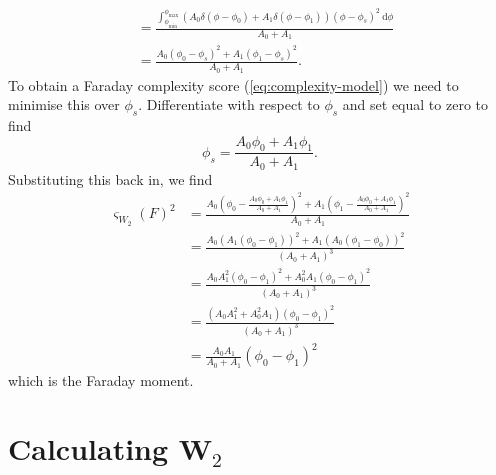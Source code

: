 \begin{appendix}
\begin{align}
        &= \frac{\int_{\phi_{\min}}^{\phi_{\max}} (A_0 \delta(\phi - \phi_0) + A_1 \delta(\phi - \phi_1)) (\phi - \phi_s)^2\ \mathrm{d}\phi}{A_0 + A_1}\\
        &= \frac{A_0 (\phi_0 - \phi_s)^2 + A_1 (\phi_1 - \phi_s)^2}{A_0 + A_1}.
    \end{align}
    To obtain a Faraday complexity score (\autoref{eq:complexity-model}) we need to minimise this over $\phi_s$. Differentiate with respect to $\phi_s$ and set equal to zero to find
    \begin{equation}
      \phi_s = \frac{A_0 \phi_0 + A_1 \phi_1}{A_0 + A_1}.
    \end{equation}
    Substituting this back in, we find
    \begin{align}
      \varsigma_{W_2}(F)^2 &= \frac{A_0 (\phi_0 - \frac{A_0 \phi_0 + A_1 \phi_1}{A_0 + A_1})^2 + A_1 (\phi_1 - \frac{A_0 \phi_0 + A_1 \phi_1}{A_0 + A_1})^2}{A_0 + A_1}\\
        &= \frac{A_0 (A_1 (\phi_0 - \phi_1))^2 + A_1 (A_0 (\phi_1 - \phi_0))^2}{(A_0 + A_1)^3}\\
        &= \frac{A_0 A_1^2 (\phi_0 - \phi_1)^2 + A_0^2 A_1 (\phi_0 - \phi_1)^2}{(A_0 + A_1)^3}\\
        &= \frac{(A_0 A_1^2 + A_0^2 A_1) (\phi_0 - \phi_1)^2}{(A_0 + A_1)^3}\\
        &= \frac{A_0 A_1}{A_0 + A_1}(\phi_0 - \phi_1)^2
    \end{align}
    which is the Faraday moment.

  \section{Calculating W$_2$}
  \label{sec:pot}

\end{appendix}
